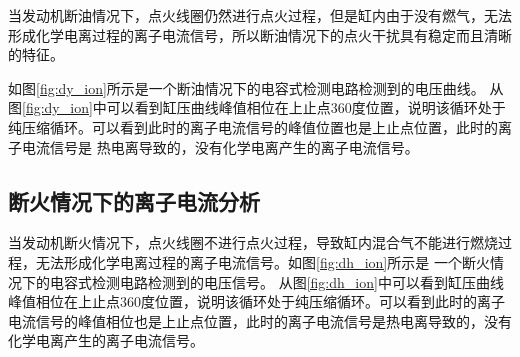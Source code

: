 当发动机断油情况下，点火线圈仍然进行点火过程，但是缸内由于没有燃气，无法形成化学电离过程的离子电流信号，所以断油情况下的点火干扰具有稳定而且清晰的特征。\par
如图\ref{fig:dy_ion}所示是一个断油情况下的电容式检测电路检测到的电压曲线。
从图\ref{fig:dy_ion}中可以看到缸压曲线峰值相位在上止点360度位置，说明该循环处于纯压缩循环。可以看到此时的离子电流信号的峰值位置也是上止点位置，此时的离子电流信号是
热电离导致的，没有化学电离产生的离子电流信号。
\subsection{断火情况下的离子电流分析}   
当发动机断火情况下，点火线圈不进行点火过程，导致缸内混合气不能进行燃烧过程，无法形成化学电离过程的离子电流信号。如图\ref{fig:dh_ion}所示是
一个断火情况下的电容式检测电路检测到的电压信号。
从图\ref{fig:dh_ion}中可以看到缸压曲线峰值相位在上止点360度位置，说明该循环处于纯压缩循环。可以看到此时的离子电流信号的峰值相位也是上止点位置，此时的离子电流信号是热电离导致的，没有化学电离产生的离子电流信号。
